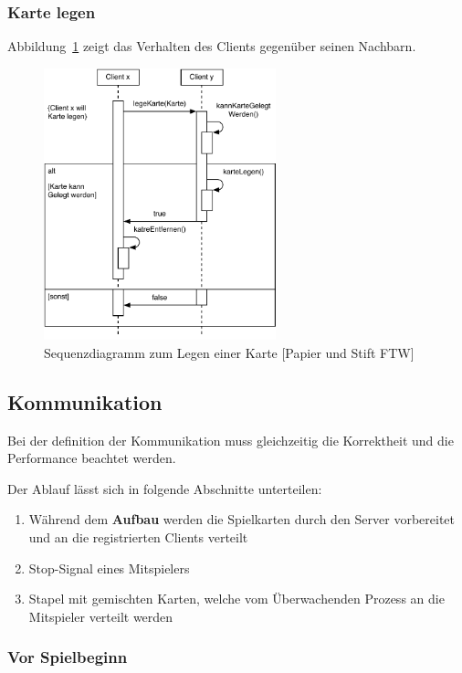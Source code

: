 \subsubsection{Karte legen}

Abbildung~\ref{SequenzdiagramClient} zeigt das Verhalten des Clients gegenüber seinen Nachbarn.

\begin{figure}[H]
  \centering
  \includegraphics[width=0.60\textwidth,angle=0]{graphics/KarteLegen.pdf}
  \caption{Sequenzdiagramm zum Legen einer Karte [Papier und Stift FTW] \hfill{} }
  \label{SequenzdiagramClient}
\end{figure}


\subsection{Kommunikation}

Bei der definition der Kommunikation muss gleichzeitig die Korrektheit und die Performance beachtet werden.

Der Ablauf lässt sich in folgende Abschnitte unterteilen:
\begin{enumerate}
	\item Während dem {\bf Aufbau} werden die Spielkarten durch den Server vorbereitet und an die registrierten Clients verteilt
	\item Stop-Signal eines Mitspielers
	\item Stapel mit gemischten Karten, welche vom Überwachenden Prozess an die Mitspieler verteilt werden
\end{enumerate}


\subsubsection{Vor Spielbeginn}

